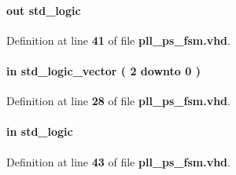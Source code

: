 \paragraph[{pll\+\_\+reset\+\_\+req}]{ {\bfseries \textcolor{keywordflow}{out}\textcolor{vhdlchar}{ }} {\bfseries \textcolor{comment}{std\+\_\+logic}\textcolor{vhdlchar}{ }} \hspace{0.3cm}{\ttfamily [Port]}}\label{classpll__ps__fsm_ad47a151888e9d7fd7ed9e2e9db4646ee}


Definition at line {\bf 41} of file {\bf pll\+\_\+ps\+\_\+fsm.\+vhd}.

\paragraph[{ps\+\_\+cnt}]{ {\bfseries \textcolor{keywordflow}{in}\textcolor{vhdlchar}{ }} {\bfseries \textcolor{comment}{std\+\_\+logic\+\_\+vector}\textcolor{vhdlchar}{ }\textcolor{vhdlchar}{(}\textcolor{vhdlchar}{ }\textcolor{vhdlchar}{ } \textcolor{vhdldigit}{2} \textcolor{vhdlchar}{ }\textcolor{keywordflow}{downto}\textcolor{vhdlchar}{ }\textcolor{vhdlchar}{ } \textcolor{vhdldigit}{0} \textcolor{vhdlchar}{ }\textcolor{vhdlchar}{)}\textcolor{vhdlchar}{ }} \hspace{0.3cm}{\ttfamily [Port]}}\label{classpll__ps__fsm_ab4f3dc07b28d01efd37b5cb899456626}


Definition at line {\bf 28} of file {\bf pll\+\_\+ps\+\_\+fsm.\+vhd}.

\paragraph[{ps\+\_\+ctrl\+\_\+busy}]{ {\bfseries \textcolor{keywordflow}{in}\textcolor{vhdlchar}{ }} {\bfseries \textcolor{comment}{std\+\_\+logic}\textcolor{vhdlchar}{ }} \hspace{0.3cm}{\ttfamily [Port]}}\label{classpll__ps__fsm_ab625b2051f0649b9e3a80710b9177c34}


Definition at line {\bf 43} of file {\bf pll\+\_\+ps\+\_\+fsm.\+vhd}.


